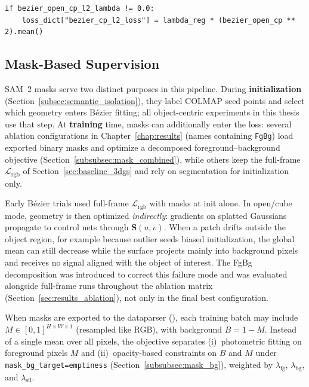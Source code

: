 \begin{lstlisting}[caption={Optional CP $L_2$ term (\filepath{splatfacto.py}).},label={lst:cp_l2}]
if bezier_open_cp_l2_lambda != 0.0:
    loss_dict["bezier_cp_l2_loss"] = lambda_reg * (bezier_open_cp ** 2).mean()
\end{lstlisting}

\subsection{Mask-Based Supervision}
\label{subsec:mask_losses}

SAM~2 masks serve two distinct purposes in this pipeline. During \textbf{initialization} (Section~\ref{subsec:semantic_isolation}), they label COLMAP seed points and select which geometry enters B\'ezier fitting; all object-centric experiments in this thesis use that step. At \textbf{training} time, masks can additionally enter the loss: several ablation configurations in Chapter~\ref{chap:results} (names containing \texttt{FgBg}) load exported binary masks and optimize a decomposed foreground--background objective (Section~\ref{subsubsec:mask_combined}), while others keep the full-frame $\mathcal{L}_{\mathrm{rgb}}$ of Section~\ref{sec:baseline_3dgs} and rely on segmentation for initialization only.

Early B\'ezier trials used full-frame $\mathcal{L}_{\mathrm{rgb}}$ with masks at init alone. In open/cube mode, geometry is then optimized \emph{indirectly}: gradients on splatted Gaussians propagate to control nets through $\mathbf{S}(u,v)$. When a patch drifts outside the object region, for example because outlier seeds biased initialization, the global mean can still decrease while the surface projects mainly into background pixels and receives no signal aligned with the object of interest. The FgBg decomposition was introduced to correct this failure mode and was evaluated alongside full-frame runs throughout the ablation matrix (Section~\ref{sec:results_ablation}), not only in the final best configuration.

When masks are exported to the dataparser (), each training batch may include  $M\in[0,1]^{H\times W\times 1}$ (resampled like RGB), with background $B=1-M$. Instead of a single mean over all pixels, the objective separates (i)~photometric fitting on foreground pixels $M$ and (ii)~opacity-based constraints on $B$ and $M$ under \texttt{mask\_bg\_target=emptiness} (Section~\ref{subsubsec:mask_bg}), weighted by $\lambda_{\mathrm{fg}}$, $\lambda_{\mathrm{bg}}$, and $\lambda_{\mathrm{sil}}$.

